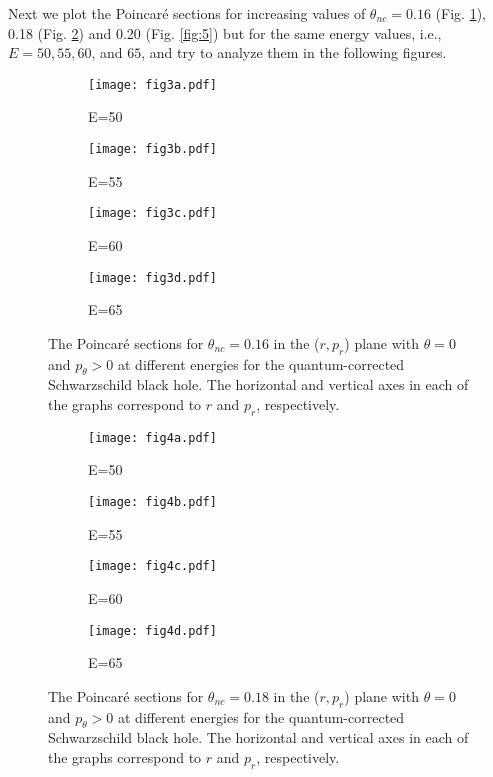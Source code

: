 \documentclass[aps,prd,showpacs,nofootinbib,floats,floatfix,preprintnumbers,groupedaddress,twocolumn]{revtex4-1}
\begin{document}
%
%
%
Next we plot the Poincar\'e sections for increasing values of $\theta_{nc}=0.16$ (Fig. \ref{fig:3}), 0.18 (Fig. \ref{fig:4}) and 0.20 (Fig. \ref{fig:5}) but for the same energy values, i.e.,  $E=50,55,60$, and $65$, and try to analyze them in the following figures. 
%
%
%
%
\begin{figure}[hbt!]
	\centering
	\begin{subfigure}[b]{0.4\linewidth}
		\texttt{[image: fig3a.pdf]}
		\caption{E=50}
	\end{subfigure}
	\begin{subfigure}[b]{0.4\linewidth}
		\texttt{[image: fig3b.pdf]}
		\caption{E=55}
	\end{subfigure}
	\begin{subfigure}[b]{0.4\linewidth}
		\texttt{[image: fig3c.pdf]}
		\caption{E=60}
	\end{subfigure}
	\begin{subfigure}[b]{0.4\linewidth}
		\texttt{[image: fig3d.pdf]}
		\caption{E=65}
	\end{subfigure}
	\caption{The Poincar\'e sections for $\theta_{nc} = 0.16$ in the ($r,p_r$) plane with $\theta = 0$ and $p_\theta > 0$ at different energies for the quantum-corrected Schwarzschild black hole. The horizontal and vertical axes in each of the graphs correspond to $r$ and $p_r$, respectively.}
	\label{fig:3}
\end{figure}
%
%
\begin{figure}[hbt!]
	\centering
	\begin{subfigure}[b]{0.4\linewidth}
		\texttt{[image: fig4a.pdf]}
		\caption{E=50}
	\end{subfigure}
	\begin{subfigure}[b]{0.4\linewidth}
		\texttt{[image: fig4b.pdf]}
		\caption{E=55}
	\end{subfigure}
	\begin{subfigure}[b]{0.4\linewidth}
		\texttt{[image: fig4c.pdf]}
		\caption{E=60}
	\end{subfigure}
	\begin{subfigure}[b]{0.4\linewidth}
		\texttt{[image: fig4d.pdf]}
		\caption{E=65}
	\end{subfigure}
	\caption{The Poincar\'e sections for $\theta_{nc} = 0.18$ in the ($r,p_r$) plane with $\theta = 0$ and $p_\theta > 0$ at different energies for the quantum-corrected Schwarzschild black hole. The horizontal and vertical axes in each of the graphs correspond to $r$ and $p_r$, respectively.}
	\label{fig:4}
\end{figure}
\end{document}
